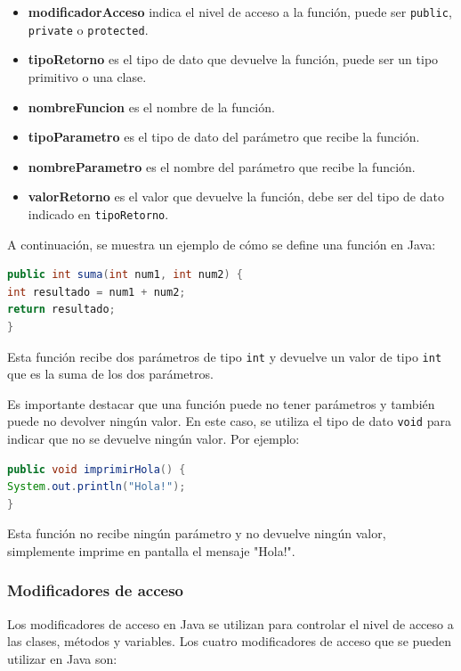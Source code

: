 \documentclass[executivepaper]{article}
\begin{document}
\begin{itemize}
\item \textbf{modificadorAcceso} indica el nivel de acceso a la función, puede ser \texttt{public}, \texttt{private} o \texttt{protected}.
\item \textbf{tipoRetorno} es el tipo de dato que devuelve la función, puede ser un tipo primitivo o una clase.
\item \textbf{nombreFuncion} es el nombre de la función.
\item \textbf{tipoParametro} es el tipo de dato del parámetro que recibe la función.
\item \textbf{nombreParametro} es el nombre del parámetro que recibe la función.
\item \textbf{valorRetorno} es el valor que devuelve la función, debe ser del tipo de dato indicado en \texttt{tipoRetorno}.
\end{itemize}

A continuación, se muestra un ejemplo de cómo se define una función en Java:

\begin{lstlisting}[language=Java]
public int suma(int num1, int num2) {
int resultado = num1 + num2;
return resultado;
}
\end{lstlisting}

Esta función recibe dos parámetros de tipo \texttt{int} y devuelve un valor de tipo \texttt{int} que es la suma de los dos parámetros.

Es importante destacar que una función puede no tener parámetros y también puede no devolver ningún valor. En este caso, se utiliza el tipo de dato \texttt{void} para indicar que no se devuelve ningún valor. Por ejemplo:

\begin{lstlisting}[language=Java]
public void imprimirHola() {
System.out.println("Hola!");
}
\end{lstlisting}

Esta función no recibe ningún parámetro y no devuelve ningún valor, simplemente imprime en pantalla el mensaje "Hola!".


\subsubsection{Modificadores de acceso}
Los modificadores de acceso en Java se utilizan para controlar el nivel de acceso a las clases, métodos y variables. 
Los cuatro modificadores de acceso que se pueden utilizar en Java son:
\end{document}

